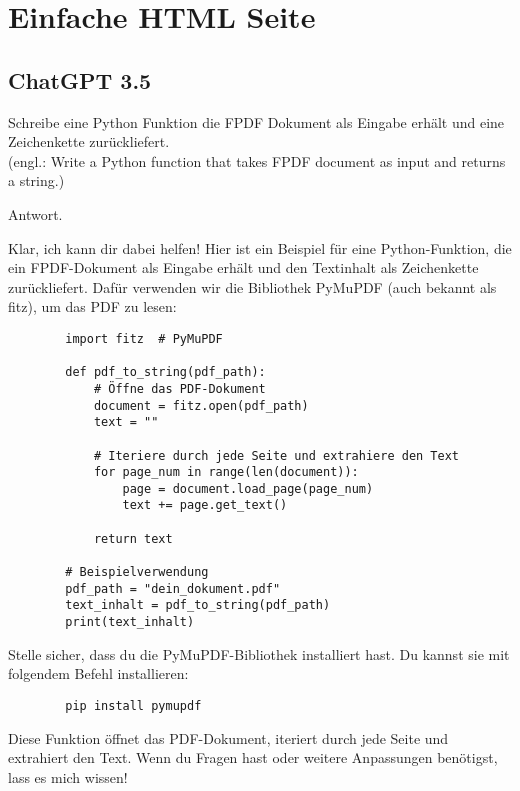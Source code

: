 \section{Einfache HTML Seite}

\subsection{ChatGPT 3.5}


\begin{tcolorbox}[
	enhanced,
	colback=BhtColorYellow!5!white,
	colframe=BhtColorYellow!75!black,
	title= Python Funktion
]
	Schreibe eine Python Funktion die FPDF Dokument als Eingabe erhält und eine Zeichenkette zurückliefert.\\
	(engl.: Write a Python function that takes FPDF document as input and returns a string.)
\end{tcolorbox}

\begin{tcolorbox}[
	enhanced,
	colback=BhtGrey!5!white,
	colframe=BhtGrey!75!black!50,
	title= Antwort ChatGPT
	]
	Antwort.
\end{tcolorbox}

\begin{tcolorbox}[
	enhanced,
	colback=BhtGrey!5!white,
	colframe=BhtGrey!75!black!50,
	title= Copilot
	]
	Klar, ich kann dir dabei helfen! Hier ist ein Beispiel für eine Python-Funktion, die ein FPDF-Dokument als Eingabe erhält und den Textinhalt als Zeichenkette zurückliefert. Dafür verwenden wir die Bibliothek PyMuPDF (auch bekannt als fitz), um das PDF zu lesen:\\
	\begin{verbatim}
		import fitz  # PyMuPDF
		
		def pdf_to_string(pdf_path):
		    # Öffne das PDF-Dokument
		    document = fitz.open(pdf_path)
		    text = ""
		
		    # Iteriere durch jede Seite und extrahiere den Text
		    for page_num in range(len(document)):
		        page = document.load_page(page_num)
		        text += page.get_text()

		    return text
		
		# Beispielverwendung
		pdf_path = "dein_dokument.pdf"
		text_inhalt = pdf_to_string(pdf_path)
		print(text_inhalt)
	\end{verbatim}
	Stelle sicher, dass du die PyMuPDF-Bibliothek installiert hast. Du kannst sie mit folgendem Befehl installieren:
	\begin{verbatim}
		pip install pymupdf
	\end{verbatim}
	Diese Funktion öffnet das PDF-Dokument, iteriert durch jede Seite und extrahiert den Text. Wenn du Fragen hast oder weitere Anpassungen benötigst, lass es mich wissen!
\end{tcolorbox}

